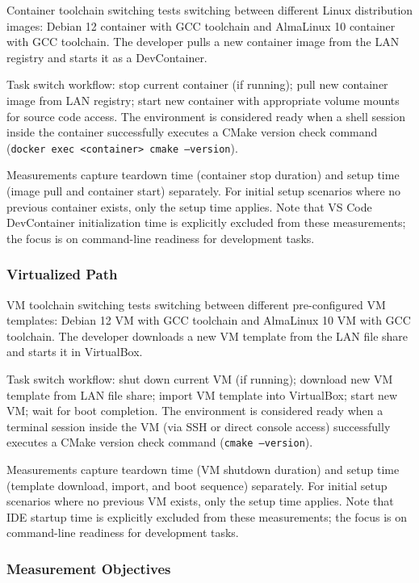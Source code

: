 Container toolchain switching tests switching between different Linux distribution images: Debian 12 container with GCC toolchain and AlmaLinux 10 container with GCC toolchain.
The developer pulls a new container image from the LAN registry and starts it as a DevContainer.

Task switch workflow: stop current container (if running); pull new container image from LAN registry; start new container with appropriate volume mounts for source code access.
The environment is considered ready when a shell session inside the container successfully executes a CMake version check command (\texttt{docker exec <container> cmake --version}).

Measurements capture teardown time (container stop duration) and setup time (image pull and container start) separately.
For initial setup scenarios where no previous container exists, only the setup time applies.
Note that VS Code DevContainer initialization time is explicitly excluded from these measurements; the focus is on command-line readiness for development tasks.

\subsubsection{Virtualized Path}

VM toolchain switching tests switching between different pre-configured VM templates: Debian 12 VM with GCC toolchain and AlmaLinux 10 VM with GCC toolchain.
The developer downloads a new VM template from the LAN file share and starts it in VirtualBox.

Task switch workflow: shut down current VM (if running); download new VM template from LAN file share; import VM template into VirtualBox; start new VM; wait for boot completion.
The environment is considered ready when a terminal session inside the VM (via SSH or direct console access) successfully executes a CMake version check command (\texttt{cmake --version}).

Measurements capture teardown time (VM shutdown duration) and setup time (template download, import, and boot sequence) separately.
For initial setup scenarios where no previous VM exists, only the setup time applies.
Note that IDE startup time is explicitly excluded from these measurements; the focus is on command-line readiness for development tasks.

\subsubsection{Measurement Objectives}


